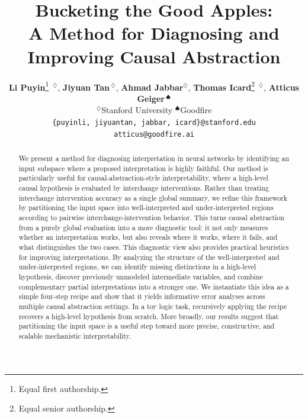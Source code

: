 \documentclass[10pt]{article}
\title{Bucketing the Good Apples: \\A Method for Diagnosing and Improving Causal Abstraction}
\author{
  \textbf{Li Puyin}\thanks{Equal first authorship.}  $^{\ \diamondsuit}$,
  \textbf{Jiyuan Tan}\footnotemark[1]  $^{\ \diamondsuit}$,
  \textbf{Ahmad Jabbar}$^{\diamondsuit}$,
  \textbf{Thomas Icard}\thanks{Equal senior authorship.}  $^{\ \diamondsuit}$,
  \textbf{Atticus Geiger}\footnotemark[2]  $^{\ \spadesuit}$  \\[6pt]
  $^{\diamondsuit}$Stanford University \quad $^{\spadesuit}$Goodfire \\
  \texttt{\{puyinli, jiyuantan, jabbar, icard\}@stanford.edu}\\
  \texttt{atticus@goodfire.ai}\\[4pt]
}
\date{}
\begin{document}
\maketitle

\begin{abstract}
We present a method for diagnosing interpretation in neural networks by identifying an input subspace where a proposed interpretation is highly faithful. Our method is particularly useful for causal-abstraction-style interpretability, where a high-level causal hypothesis is evaluated by interchange interventions. Rather than treating interchange intervention accuracy as a single global summary, we refine this framework by partitioning the input space into well-interpreted and under-interpreted regions according to pairwise interchange-intervention behavior. This turns causal abstraction from a purely global evaluation into a more diagnostic tool: it not only measures whether an interpretation works, but also reveals where it works, where it fails, and what distinguishes the two cases. This diagnostic view also provides practical heuristics for improving interpretations. By analyzing the structure of the well-interpreted and under-interpreted regions, we can identify missing distinctions in a high-level hypothesis, discover previously unmodeled intermediate variables, and combine complementary partial interpretations into a stronger one. We instantiate this idea as a simple four-step recipe and show that it yields informative error analyses across multiple causal abstraction settings. In a toy logic task, recursively applying the recipe recovers a high-level hypothesis from scratch. More broadly, our results suggest that partitioning the input space is a useful step toward more precise, constructive, and scalable mechanistic interpretability.
\end{abstract}










\appendix

\end{document}
